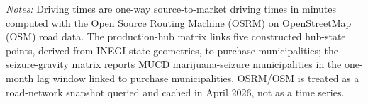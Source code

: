 \begin{table}[H]
\centering
\small
\caption{OSM/OSRM driving-time matrix diagnostics}
\label{tab:appendix-osm-osrm}
\begin{threeparttable}
\begin{tablenotes}[flushleft]\small
\item \textit{Notes:} Driving times are one-way source-to-market driving times in minutes computed with the Open Source Routing Machine (OSRM) on OpenStreetMap (OSM) road data. The production-hub matrix links five constructed hub-state points, derived from INEGI state geometries, to purchase municipalities; the seizure-gravity matrix reports MUCD marijuana-seizure municipalities in the one-month lag window linked to purchase municipalities. OSRM/OSM is treated as a road-network snapshot queried and cached in April 2026, not as a time series.
\end{tablenotes}
\end{threeparttable}
\end{table}
